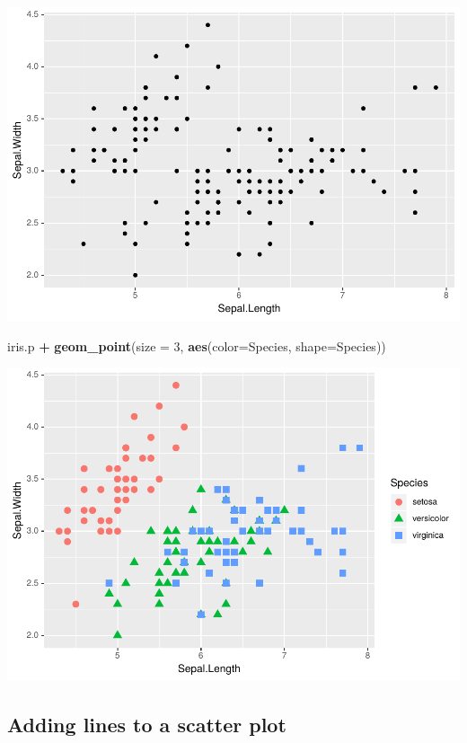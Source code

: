 \documentclass[
]{krantz}
\makeatletter
\newenvironment{Shaded}{\begin{snugshade}}{\end{snugshade}}
\newcommand{\DataTypeTok}[1]{\textcolor[rgb]{0.27,0.27,0.27}{#1}}
\newcommand{\DecValTok}[1]{\textcolor[rgb]{0.06,0.06,0.06}{#1}}
\newcommand{\KeywordTok}[1]{\textcolor[rgb]{0.27,0.27,0.27}{\textbf{#1}}}
\newcommand{\NormalTok}[1]{#1}
\newcommand{\OperatorTok}[1]{\textcolor[rgb]{0.43,0.43,0.43}{\textbf{#1}}}
\newcommand{\StringTok}[1]{\textcolor[rgb]{0.5,0.5,0.5}{#1}}
\newenvironment{kframe}{%
\medskip{}
\setlength{\fboxsep}{.8em}
 \def\at@end@of@kframe{}%
 \ifinner\ifhmode%
  \def\at@end@of@kframe{\end{minipage}}%
  \begin{minipage}{\columnwidth}%
 \fi\fi%
 \def\FrameCommand##1{\hskip\@totalleftmargin \hskip-\fboxsep
 \colorbox{shadecolor}{##1}\hskip-\fboxsep
     \hskip-\linewidth \hskip-\@totalleftmargin \hskip\columnwidth}%
 \MakeFramed {\advance\hsize-\width
   \@totalleftmargin\z@ \linewidth\hsize
   \@setminipage}}%
 {\par\unskip\endMakeFramed%
 \at@end@of@kframe}
\renewenvironment{Shaded}{\begin{kframe}}{\end{kframe}}
\makeatother
\begin{document}
\includegraphics{bookdown_files/figure-latex/unnamed-chunk-61-1.pdf}

\begin{Shaded}
\begin{Highlighting}[]
\NormalTok{iris.p }\OperatorTok{+}\StringTok{ }\KeywordTok{geom\_point}\NormalTok{(}\DataTypeTok{size =} \DecValTok{3}\NormalTok{, }\KeywordTok{aes}\NormalTok{(}\DataTypeTok{color=}\NormalTok{Species, }\DataTypeTok{shape=}\NormalTok{Species))}
\end{Highlighting}
\end{Shaded}

\includegraphics{bookdown_files/figure-latex/unnamed-chunk-61-2.pdf}

\hypertarget{adding-lines-to-a-scatter-plot}{%
\subsection{Adding lines to a scatter plot}\label{adding-lines-to-a-scatter-plot}}
\end{document}
